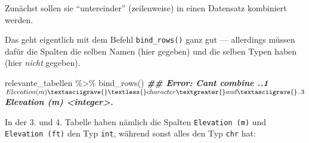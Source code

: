 \documentclass[
  ngerman,
]{article}
\newenvironment{Shaded}{\begin{snugshade}}{\end{snugshade}}
\newcommand{\DocumentationTok}[1]{\textcolor[rgb]{0.56,0.35,0.01}{\textbf{\textit{#1}}}}
\newcommand{\FunctionTok}[1]{\textcolor[rgb]{0.00,0.00,0.00}{#1}}
\newcommand{\NormalTok}[1]{#1}
\newcommand{\SpecialCharTok}[1]{\textcolor[rgb]{0.00,0.00,0.00}{#1}}
\begin{document}
Zunächst sollen sie ``untereinder'' (zeilenweise) in einen Datensatz kombiniert werden.

Das geht eigentlich mit dem Befehl \texttt{bind\_rows()} ganz gut --- allerdings müssen dafür die Spalten die selben Namen (hier gegeben) und die selben Typen haben (hier \emph{nicht} gegeben).

\begin{Shaded}
\begin{Highlighting}[]
\NormalTok{relevante\_tabellen }\SpecialCharTok{\%\textgreater{}\%}
  \FunctionTok{bind\_rows}\NormalTok{()}
\DocumentationTok{\#\# Error: Can\textquotesingle{}t combine \textasciigrave{}..1$Elevation (m)\textasciigrave{} \textless{}character\textgreater{} and \textasciigrave{}..3$Elevation (m)\textasciigrave{} \textless{}integer\textgreater{}.}
\end{Highlighting}
\end{Shaded}

In der 3. und 4. Tabelle haben nämlich die Spalten \texttt{Elevation\ (m)} und \texttt{Elevation\ (ft)} den Typ \texttt{int}, während sonst alles den Typ \texttt{chr} hat:
\end{document}
